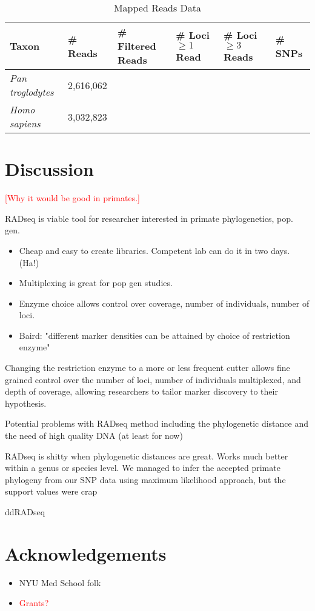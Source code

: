 \documentclass[12pt]{article}
\begin{document}
\begin{table}[h]
\caption{Mapped Reads Data}
\begin{center}
	\small
	\begin{tabular}{ p{3cm} || p{1.75cm} | p{1.75cm} || p{1.75cm} | p{1.75cm} | l }
		\hline
		Taxon & \# Reads & \# Filtered Reads & \# Loci $\ge 1$ Read & \# Loci $\ge 3$ Reads & \# SNPs \\ \hline\hline
		\emph{Pan troglodytes} & 2,616,062 &  &  &  &  \\ \hline
		\emph{Homo sapiens}    & 3,032,823 &  &  &  &  \\ \hline
	\end{tabular}
\end{center}
\end{table}


\section{Discussion}

\textcolor{red}{[Why it would be good in primates.]}

RADseq is viable tool for researcher interested in primate phylogenetics, pop. gen.

\begin{itemize}
	\item Cheap and easy to create libraries. Competent lab can do it in two days. (Ha!)
	\item Multiplexing is great for pop gen studies.
	\item Enzyme choice allows control over coverage, number of individuals, number of loci.
	\item Baird: "different marker densities can be attained by choice of restriction enzyme"
\end{itemize}
	
Changing the restriction enzyme to a more or less frequent cutter allows fine grained control over the number of loci, number of individuals multiplexed, and depth of coverage, allowing researchers to tailor marker discovery to their hypothesis. 

Potential problems with RADseq method including the phylogenetic distance and the need of high quality DNA (at least for now)

RADseq is shitty when phylogenetic distances are great. Works much better within a genus or species level. We managed to infer the accepted primate phylogeny from our SNP data using maximum likelihood approach, but the support values were crap

ddRADseq

\section{Acknowledgements}
\begin{itemize}
	\item NYU Med School folk
	\item \textcolor{red}{Grants?}
\end{itemize}
\end{document}
